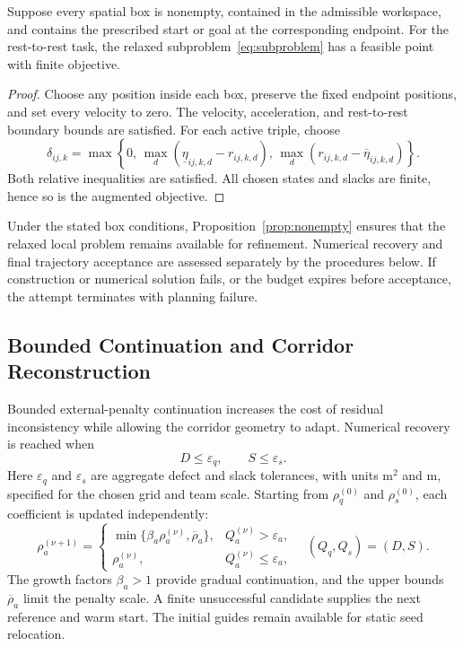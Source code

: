 \begin{Proposition}
\label{prop:nonempty}
Suppose every spatial box is nonempty, contained in the admissible workspace, and contains the prescribed start or goal at the corresponding endpoint. For the rest-to-rest task, the relaxed subproblem~\eqref{eq:subproblem} has a feasible point with finite objective.
\end{Proposition}
\begin{proof}
Choose any position inside each box, preserve the fixed endpoint positions, and set every velocity to zero. The velocity, acceleration, and rest-to-rest boundary bounds are satisfied. For each active triple, choose
\begin{equation}
 \delta_{ij,k}=\max\!\left\{0,\,
 \max_d(\underline{\eta}_{ij,k,d}-r_{ij,k,d}),\,
 \max_d(r_{ij,k,d}-\overline{\eta}_{ij,k,d})\right\}.
 \label{eq:feasiblepoint}
\end{equation}
Both relative inequalities are satisfied. All chosen states and slacks are finite, hence so is the augmented objective.
\end{proof}
Under the stated box conditions, Proposition~\ref{prop:nonempty} ensures that the relaxed local problem remains available for refinement. Numerical recovery and final trajectory acceptance are assessed separately by the procedures below. If construction or numerical solution fails, or the budget expires before acceptance, the attempt terminates with planning failure.

\subsection{Bounded Continuation and Corridor Reconstruction}
Bounded external-penalty continuation increases the cost of residual inconsistency while allowing the corridor geometry to adapt. Numerical recovery is reached when
\begin{equation}
 D\leq\varepsilon_q,\qquad S\leq\varepsilon_s.
 \label{eq:tolerances}
\end{equation}
Here $\varepsilon_q$ and $\varepsilon_s$ are aggregate defect and slack tolerances, with units $\mathrm{m}^2$ and $\mathrm{m}$, specified for the chosen grid and team scale. Starting from $\rho_q^{(0)}$ and $\rho_s^{(0)}$, each coefficient is updated independently:
\begin{equation}
 \rho_a^{(\nu+1)}=
 \begin{cases}
 \min\{\beta_a\rho_a^{(\nu)},\overline\rho_a\},&Q_a^{(\nu)}>\varepsilon_a,\\
 \rho_a^{(\nu)},&Q_a^{(\nu)}\leq\varepsilon_a,
 \end{cases}
 \quad (Q_q,Q_s)=(D,S).
 \label{eq:weights}
\end{equation}
The growth factors $\beta_a>1$ provide gradual continuation, and the upper bounds $\overline\rho_a$ limit the penalty scale. A finite unsuccessful candidate supplies the next reference and warm start. The initial guides remain available for static seed relocation.

